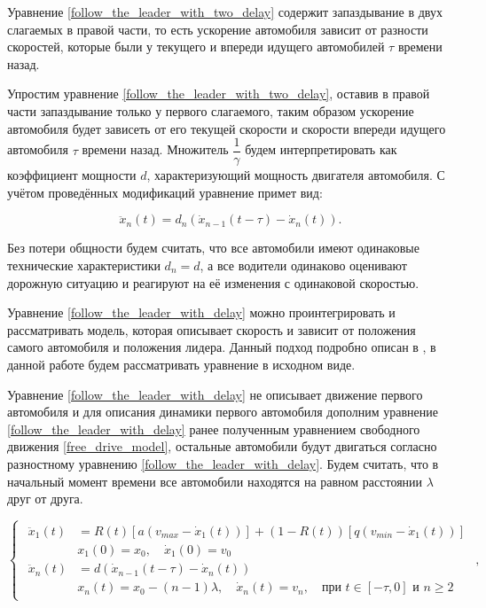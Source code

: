 \documentclass[12pt, a4paper]{extarticle}
\numberwithin{equation}{section}
\numberwithin{figure}{section}
\begin{document}
Уравнение \eqref{follow_the_leader_with_two_delay} содержит запаздывание в двух слагаемых в правой части, то есть ускорение автомобиля зависит от разности скоростей, которые были у текущего и впереди идущего автомобилей $\tau$ времени назад.

Упростим уравнение \eqref{follow_the_leader_with_two_delay}, оставив в правой части запаздывание только у первого слагаемого, таким образом ускорение автомобиля будет зависеть от его текущей скорости и скорости впереди идущего автомобиля $\tau$ времени назад. Множитель $\dfrac{1}{\gamma}$ будем интерпретировать как коэффициент мощности $d$, характеризующий мощность двигателя автомобиля. С учётом проведённых модификаций уравнение примет вид:

\begin{equation} \label{follow_the_leader_with_delay}
\ddot{x}_n(t) = d_{n} (\dot{x}_{n-1}(t-\tau) - \dot{x}_{n}(t)).
\end{equation}

Без потери общности будем считать, что все автомобили имеют одинаковые технические характеристики $d_n = d$, а все водители одинаково оценивают дорожную ситуацию и реагируют на её изменения с одинаковой скоростью.

Уравнение \eqref{follow_the_leader_with_delay} можно проинтегрировать и рассматривать модель, которая описывает скорость и зависит от положения самого автомобиля и положения лидера. Данный подход подробно описан в \cite{Course}, в данной работе будем рассматривать уравнение в исходном виде. 

Уравнение \eqref{follow_the_leader_with_delay} не описывает движение первого автомобиля и для описания динамики первого автомобиля дополним уравнение \eqref{follow_the_leader_with_delay} ранее полученным уравнением свободного движения \eqref{free_drive_model}, остальные автомобили будут двигаться согласно разностному уравнению \eqref{follow_the_leader_with_delay}. Будем считать, что в начальный момент времени все автомобили находятся на равном  расстоянии $\lambda$ друг от друга.

\begin{equation} \label{follow_the_leader_full_model}
\begin{cases}
\begin{split}
\ddot{x}_1(t)& = R(t) \left[ a\left(v_{max}-\dot{x}_1(t) \right)\right] + (1-R(t)) \left[ q\left( v_{min} - \dot{x}_1(t)\right) \right] \\
&x_{1}(0)=x_0, \quad \dot{x}_{1}(0)=v_{0}\\
\ddot{x}_{n}(t)& = d(\dot{x}_{n-1}(t-\tau)-\dot{x}_{n}(t)) \\
&x_n(t)=x_0-(n-1)\lambda, \quad \dot{x}_n(t)=v_{n}, \quad \text{при } t \in [-\tau,0] \text{ и } n\geq2
\end{split}
\end{cases},
\end{equation}
\end{document}
